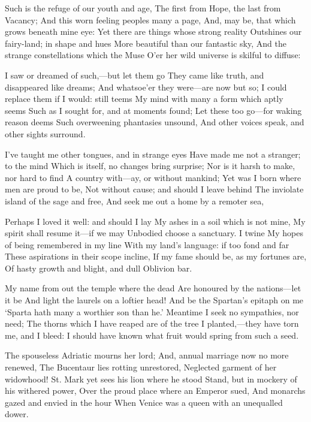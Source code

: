 \documentclass[10pt,twocolumn]{book}
\begin{document}
   Such is the refuge of our youth and age,
   The first from Hope, the last from Vacancy;
   And this worn feeling peoples many a page,
   And, may be, that which grows beneath mine eye:
   Yet there are things whose strong reality
   Outshines our fairy-land; in shape and hues
   More beautiful than our fantastic sky,
   And the strange constellations which the Muse
O'er her wild universe is skilful to diffuse:


   I saw or dreamed of such,---but let them go\textemdash
   They came like truth, and disappeared like dreams;
   And whatsoe'er they were---are now but so;
   I could replace them if I would:  still teems
   My mind with many a form which aptly seems
   Such as I sought for, and at moments found;
   Let these too go---for waking reason deems
   Such overweening phantasies unsound,
And other voices speak, and other sights surround.


   I've taught me other tongues, and in strange eyes
   Have made me not a stranger; to the mind
   Which is itself, no changes bring surprise;
   Nor is it harsh to make, nor hard to find
   A country with---ay, or without mankind;
   Yet was I born where men are proud to be,
   Not without cause; and should I leave behind
   The inviolate island of the sage and free,
And seek me out a home by a remoter sea,


   Perhaps I loved it well:  and should I lay
   My ashes in a soil which is not mine,
   My spirit shall resume it---if we may
   Unbodied choose a sanctuary.  I twine
   My hopes of being remembered in my line
   With my land's language:  if too fond and far
   These aspirations in their scope incline,\textemdash
   If my fame should be, as my fortunes are,
Of hasty growth and blight, and dull Oblivion bar.


   My name from out the temple where the dead
   Are honoured by the nations---let it be\textemdash
   And light the laurels on a loftier head!
   And be the Spartan's epitaph on me\textemdash
  `Sparta hath many a worthier son than he.'
   Meantime I seek no sympathies, nor need;
   The thorns which I have reaped are of the tree
   I planted,---they have torn me, and I bleed:
I should have known what fruit would spring from such a seed.


   The spouseless Adriatic mourns her lord;
   And, annual marriage now no more renewed,
   The Bucentaur lies rotting unrestored,
   Neglected garment of her widowhood!
   St. Mark yet sees his lion where he stood
   Stand, but in mockery of his withered power,
   Over the proud place where an Emperor sued,
   And monarchs gazed and envied in the hour
When Venice was a queen with an unequalled dower.
\end{document}
